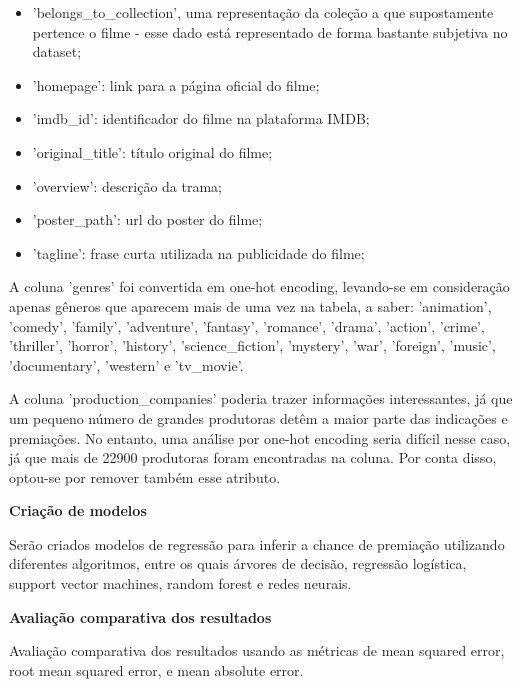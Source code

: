             \begin{itemize}
                \item 'belongs\_to\_collection', uma representação da coleção a que supostamente pertence o filme - esse dado está representado de forma bastante subjetiva no dataset;
                \item 'homepage': link para a página oficial do filme;
                \item 'imdb\_id': identificador do filme na plataforma IMDB;
                \item 'original\_title': título original do filme;
                \item 'overview': descrição da trama;
                \item 'poster\_path': url do poster do filme;
                \item 'tagline': frase curta utilizada na publicidade do filme;
            \end{itemize}

            A coluna 'genres' foi convertida em one-hot encoding, levando-se em consideração apenas gêneros que aparecem mais de uma vez na tabela, a saber: 'animation', 'comedy', 'family', 'adventure', 'fantasy', 'romance', 'drama', 'action', 'crime', 'thriller', 'horror', 'history', 'science\_fiction', 'mystery', 'war', 'foreign', 'music', 'documentary', 'western' e 'tv\_movie'.

            A coluna 'production\_companies' poderia trazer informações interessantes, já que um pequeno número de grandes produtoras detêm a maior parte das indicações e premiações\cite{argon2020}. No entanto, uma análise por one-hot encoding seria difícil nesse caso, já que mais de 22900 produtoras foram encontradas na coluna. Por conta disso, optou-se por remover também esse atributo.

            \textbf{Criação de modelos}\par
            Serão criados modelos de regressão para inferir a chance de premiação utilizando diferentes algoritmos, entre os quais árvores de decisão, regressão logística, support vector machines, random forest e redes neurais.\newline
    
            \textbf{Avaliação comparativa dos resultados}\par
            Avaliação comparativa dos resultados usando as métricas de mean squared error, root mean squared error, e mean absolute error.\newline
    
